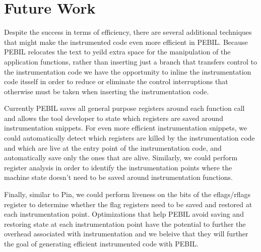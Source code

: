 \section{Future Work}
\label{sec:Future}

Despite the success in terms of efficiency, there are several additional
techniques that might make the instrumented code even more efficient in PEBIL.
Because PEBIL relocates the text to yeild extra space for the manipulation of
the application functions, rather than inserting just a branch that transfers
control to the instrumentation code we have the opportunity to inline the
instrumentation code itsself in order to reduce or eliminate the control
interruptions  that otherwise must be taken when inserting the instrumentation
code.

Currently PEBIL saves all general purpose registers around each function call
and allows the tool developer to state which registers are saved around
instrumentation snippets. For even more efficient instrumentation snippets, we
could automatically detect which registers are killed by the instrumentation
code and which are live at the entry point of the instrumentation code, and
automatically save only the ones that are alive. Similarly, we could perform
register analysis in order to identify the instrumentation points where the
machine state doesn't need to be saved around instrumentation functions. 

Finally, similar to Pin, we could perform liveness on the bits of the
eflags/rflags register to determine whether the flag registers need to be saved
and restored at each instrumentation point. Optimizations that help PEBIL avoid
saving and restoring state at each instrumentation point have the potential to
further the overhead associated with instrumentation and we beleive that they
will further the goal of generating efficient instrumented code with PEBIL.


